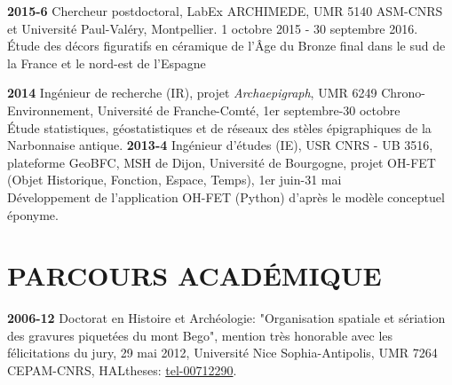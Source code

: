 \documentclass{article}
\newcommand{\fr}[1]{#1}       %
\newcommand{\en}[1]{}     %
\begin{document}
\smallbreak
\textbf{2015-6} \fr{Chercheur postdoctoral, LabEx ARCHIMEDE, UMR 5140 ASM-CNRS et Université Paul-Valéry, Montpellier. 1 octobre 2015 - 30 septembre 2016.} \en{Postdoctoral Researcher, LabEx ARCHIMEDE, UMR 5140 ASM-CNRS and University Paul-Valéry, Montpellier. October 1, 2015 - September 30, 2016.} \\
\hspace*{0.5cm} \fr{Étude des décors figuratifs en céramique de l'Âge du Bronze final dans le sud de la France et le nord-est de l'Espagne} \en{Study of figurative ceramic decorations from the Late Bronze Age in southern France and northeastern Spain}

\smallbreak
\textbf{2014} \fr{Ingénieur de recherche (IR), projet \textit{Archaepigraph}, UMR 6249 Chrono-Environnement, Université de Franche-Comté, 1er septembre-30 octobre} \en{Research Engineer, \textit{Archaepigraph} project, UMR 6249 Chrono-Environnement, University of Franche-Comté, September 1-October 30} \\
\hspace*{0.5cm} \fr{Étude statistiques, géostatistiques et de réseaux des stèles épigraphiques de la Narbonnaise antique.} \en{Statistical, geostatistical, and network studies of the epigraphic steles from ancient Narbonnaise.}
\smallbreak
\textbf{2013-4} \fr{Ingénieur d'études (IE), USR CNRS - UB 3516, plateforme GeoBFC, MSH de Dijon, Université de Bourgogne, projet OH-FET (Objet Historique, Fonction, Espace, Temps), 1er juin-31 mai} \en{Study Engineer, USR CNRS - UB 3516, GeoBFC platform, MSH of Dijon, University of Burgundy, OH-FET project (Historical Object, Function, Space, Time), June 1-May 31} \\
\hspace*{0.5cm} \fr{Développement de l'application OH-FET (Python) d'après le modèle conceptuel éponyme.} \en{Development of the OH-FET application (Python) based on the eponymous conceptual model.}




\section{\fr{PARCOURS ACADÉMIQUE}\en{ACADEMIC BACKGROUND}}

\textbf{2006-12} 
\fr{Doctorat en Histoire et Archéologie: "Organisation spatiale et sériation des gravures piquetées du mont Bego", mention très honorable avec les félicitations du jury, 29 mai 2012, Université Nice Sophia-Antipolis, UMR 7264 CEPAM-CNRS, HALtheses: \href{https://tel.archives-ouvertes.fr/tel-00712290}{tel-00712290}.}
\en{PhD in History and Archaeology: "Spatial Organization and Seriation of the Punched Engravings of Mount Bego", with high honors and jury's congratulations, May 29, 2012, University of Nice Sophia-Antipolis, UMR 7264 CEPAM-CNRS, HALtheses: \href{https://tel.archives-ouvertes.fr/tel-00712290}{tel-00712290}.}
\end{document}
